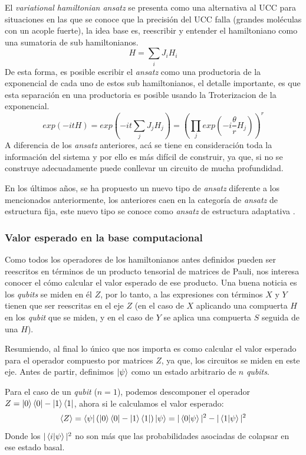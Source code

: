 El \textit{variational hamiltonian ansatz} \cite{PhysRevA.92.042303} se presenta como una alternativa al UCC para situaciones en las que se conoce que la precisión del UCC falla (grandes moléculas con un acople fuerte), la idea base es, reescribir y entender el hamiltoniano como una sumatoria de sub hamiltonianos.
\begin{equation*}
    H = \sum_i J_i H_i
\end{equation*}
De esta forma, es posible escribir el \textit{ansatz} como una productoria de la exponencial de cada uno de estos sub hamiltonianos, el detalle importante, es que esta separación en una productoria es posible usando la Troterizacion de la exponencial.
\begin{equation*}
    exp(-itH) = exp( -it\sum_j J_j H_j ) = ( \prod_j exp(-i\frac{\theta}{r} H_j) )^r
\end{equation*}
A diferencia de los \textit{ansatz} anteriores, acá se tiene en consideración toda la información del sistema y por ello es más difícil de construir, ya que, si no se construye adecuadamente puede conllevar un circuito de mucha profundidad.


En los últimos años, se ha propuesto un nuevo tipo de \textit{ansatz} diferente a los mencionados anteriormente, los anteriores caen en la categoría de \textit{ansatz} de estructura fija, este nuevo tipo se conoce como \textit{ansatz} de estructura adaptativa \cite{ADAPTVQE}.


\subsubsection{Valor esperado en la base computacional}
Como todos los operadores de los hamiltonianos antes definidos pueden ser reescritos en términos de un producto tensorial de matrices de Pauli, nos interesa conocer el cómo calcular el valor esperado de ese producto. Una buena noticia es los \textit{qubits} se miden en él $Z$, por lo tanto, a las expresiones con términos $X$ y $Y$ tienen que ser reescritas en el eje $Z$ (en el caso de $X$ aplicando una compuerta $H$ en los \textit{qubit} que se miden, y en el caso de $Y$ se aplica una compuerta $S$ seguida de una $H$).

Resumiendo, al final lo único que nos importa es como calcular el valor esperado para el operador compuesto por matrices $Z$, ya que, los circuitos se miden en este eje. Antes de partir, definimos $\ket{\psi}$  como un estado arbitrario de $n$ \textit{qubits}.

Para el caso de un \textit{qubit} ($n=1$), podemos descomponer el operador $Z = \ket{0}\bra{0} - \ket{1}\bra{1}$, ahora si le calculamos el valor esperado:
\begin{equation*}
    \expval{Z} = \bra{\psi} (\ket{0}\bra{0} - \ket{1}\bra{1}) \ket{\psi} = |\bra{0}\ket{\psi}|^2 -  |\bra{1}\ket{\psi}|^2
\end{equation*}
Donde los $|\bra{i}\ket{\psi}|^2$ no son más que las probabilidades asociadas de colapsar en ese estado basal.

